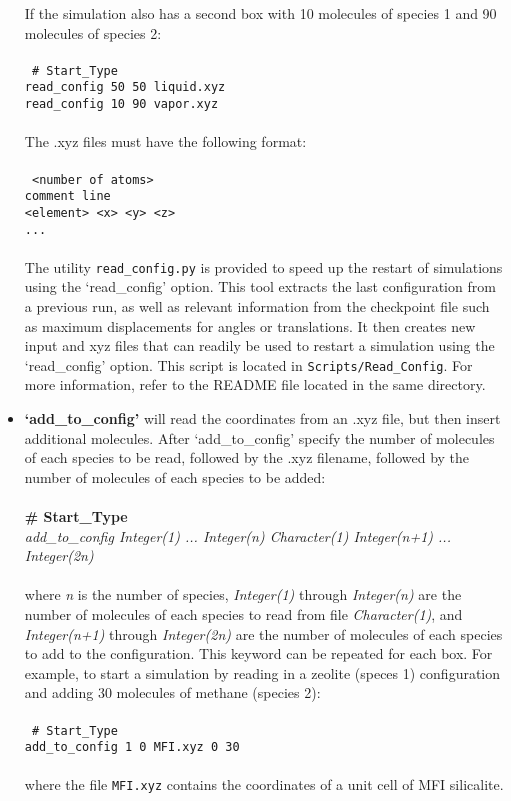 \begin{itemize}
%
If the simulation also has a second box with 10 molecules of species 1 and 90 molecules of species 2: \\ \\ 
%
\texttt{
\# Start\_Type \\
read\_config 50 50 liquid.xyz \\
read\_config 10 90 vapor.xyz \\} \\
%
The .xyz files must have the following format:\\ \\
%
\texttt{
 <number of atoms>\\
 comment line\\
 <element> <x> <y> <z>\\
 ...\\
} \\
%
The utility \texttt{read\_config.py} is provided to speed up the restart of simulations using the `read\_config' option.
This tool extracts the last configuration from a previous run, as well as relevant information from the checkpoint file 
such as maximum displacements for angles or translations. It then creates new input and xyz files that can readily be
used to restart a simulation using the `read\_config' option. This script is located in \texttt{Scripts/Read\_Config}. 
For more information, refer to the README file located in the same directory.

\item {\textbf{`add\_to\_config'}} will read the coordinates from an .xyz file, but then insert additional molecules.
After `add\_to\_config' specify the number of molecules of each species to be read, followed by the .xyz filename, 
followed by the number of molecules of each species to be added: \\ \\
%
{\bf \# Start\_Type} \\
{\it add\_to\_config Integer(1) ... Integer(n) Character(1) Integer(n+1) ... Integer(2n)}\\ \\
%
where {\it n} is the number of species, {\it Integer(1)} through {\it Integer(n)} are the number of molecules of each
species to read from file {\it Character(1)}, and {\it Integer(n+1)} through {\it Integer(2n)} are the number of molecules
of each species to add to the configuration.
This keyword can be repeated for each box.
For example, to start a simulation by reading in a zeolite (speces 1) configuration and adding 30 molecules of methane (species 2): \\ \\
%
\texttt{
\# Start\_Type \\
add\_to\_config  1  0 MFI.xyz 0 30 \\} \\
%
where the file \texttt{MFI.xyz} contains the coordinates of a unit cell of MFI silicalite.


\end{itemize}
